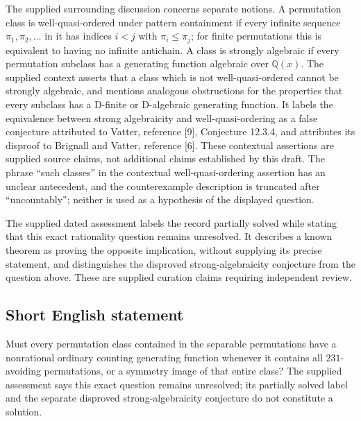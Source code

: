 \documentclass[11pt]{article}
\newcommand{\Q}{\mathbb{Q}}
\begin{document}
The supplied surrounding discussion concerns separate notions. A permutation class is well-quasi-ordered under pattern containment if every infinite sequence \(\pi_1,\pi_2,\ldots\) in it has indices \(i<j\) with \(\pi_i\leq\pi_j\); for finite permutations this is equivalent to having no infinite antichain. A class is strongly algebraic if every permutation subclass has a generating function algebraic over \(\Q(x)\). The supplied context asserts that a class which is not well-quasi-ordered cannot be strongly algebraic, and mentions analogous obstructions for the properties that every subclass has a D-finite or D-algebraic generating function. It labels the equivalence between strong algebraicity and well-quasi-ordering as a false conjecture attributed to Vatter, reference [9], Conjecture 12.3.4, and attributes its disproof to Brignall and Vatter, reference [6]. These contextual assertions are supplied source claims, not additional claims established by this draft. The phrase ``such classes'' in the contextual well-quasi-ordering assertion has an unclear antecedent, and the counterexample description is truncated after ``uncountably''; neither is used as a hypothesis of the displayed question.

The supplied dated assessment labels the record partially solved while stating that this exact rationality question remains unresolved. It describes a known theorem as proving the opposite implication, without supplying its precise statement, and distinguishes the disproved strong-algebraicity conjecture from the question above. These are supplied curation claims requiring independent review.
\subsection{Short English statement}
Must every permutation class contained in the separable permutations have a nonrational ordinary counting generating function whenever it contains all \(231\)-avoiding permutations, or a symmetry image of that entire class? The supplied assessment says this exact question remains unresolved; its partially solved label and the separate disproved strong-algebraicity conjecture do not constitute a solution.
\end{document}
